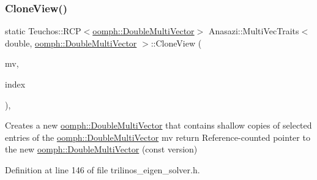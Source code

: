 \subsubsection{\texorpdfstring{Clone\+View()}{CloneView()}\hspace{0.1cm}{\footnotesize\ttfamily [3/3]}}
{\footnotesize\ttfamily static Teuchos\+::\+R\+CP$<$\hyperlink{classoomph_1_1DoubleMultiVector}{oomph\+::\+Double\+Multi\+Vector}$>$ Anasazi\+::\+Multi\+Vec\+Traits$<$ double, \hyperlink{classoomph_1_1DoubleMultiVector}{oomph\+::\+Double\+Multi\+Vector} $>$\+::Clone\+View (\begin{DoxyParamCaption}\item[{\hyperlink{classoomph_1_1DoubleMultiVector}{oomph\+::\+Double\+Multi\+Vector} \&}]{mv,  }\item[{const Teuchos\+::\+Range1D \&}]{index }\end{DoxyParamCaption})\hspace{0.3cm}{\ttfamily [inline]}, {\ttfamily [static]}}



Creates a new \hyperlink{classoomph_1_1DoubleMultiVector}{oomph\+::\+Double\+Multi\+Vector} that contains shallow copies of selected entries of the \hyperlink{classoomph_1_1DoubleMultiVector}{oomph\+::\+Double\+Multi\+Vector} mv return Reference-\/counted pointer to the new \hyperlink{classoomph_1_1DoubleMultiVector}{oomph\+::\+Double\+Multi\+Vector} (const version) 



Definition at line 146 of file trilinos\+\_\+eigen\+\_\+solver.\+h.

\mbox{\label{classAnasazi_1_1MultiVecTraits_3_01double_00_01oomph_1_1DoubleMultiVector_01_4_a74ddaaa62a646c5e4696b964eb1ef745}} 
